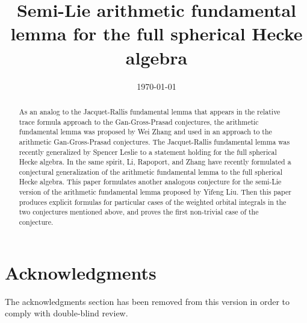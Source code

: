 \documentclass[11pt,colorlinks]{amsart}
\title[Semi-Lie Hecke AFL]
{Semi-Lie arithmetic fundamental lemma for the full spherical Hecke algebra}
\author{}
\date{\today}
\begin{document}
\begin{abstract}
  As an analog to the Jacquet-Rallis fundamental lemma that appears in the
  relative trace formula approach to the Gan-Gross-Prasad conjectures,
  the arithmetic fundamental lemma was proposed by Wei Zhang and used in an approach
  to the arithmetic Gan-Gross-Prasad conjectures.
  The Jacquet-Rallis fundamental lemma was recently generalized by Spencer Leslie
  to a statement holding for the full spherical Hecke algebra.
  In the same spirit, Li, Rapoport, and Zhang
  have recently formulated a conjectural generalization of the arithmetic
  fundamental lemma to the full spherical Hecke algebra.
  This paper formulates another analogous conjecture for the semi-Lie version
  of the arithmetic fundamental lemma proposed by Yifeng Liu.
  Then this paper produces explicit formulas for particular cases
  of the weighted orbital integrals in the two conjectures mentioned above,
  and proves the first non-trivial case of the conjecture.
\end{abstract}

\maketitle

\tableofcontents
\newpage


\section{Acknowledgments}
The acknowledgments section has been removed from this version
in order to comply with double-blind review.


















\printbibliography[title=References]
\end{document}

